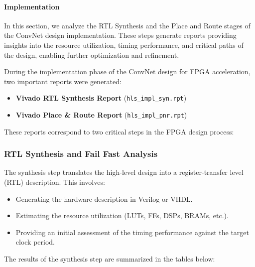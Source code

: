 \documentclass{article}
\begin{document}
\paragraph{Implementation}
In this section, we analyze the RTL Synthesis and the Place and Route stages of the ConvNet design implementation. These steps generate reports providing insights into the resource utilization, timing performance, and critical paths of the design, enabling further optimization and refinement.

During the implementation phase of the ConvNet design for FPGA acceleration, two important reports were generated:

\begin{itemize}
    \item \textbf{Vivado RTL Synthesis Report} (\texttt{hls\_impl\_syn.rpt})
    \item \textbf{Vivado Place \& Route Report} (\texttt{hls\_impl\_pnr.rpt})
\end{itemize}

These reports correspond to two critical steps in the FPGA design process: 

\subsubsection{RTL Synthesis and Fail Fast Analysis}
The synthesis step translates the high-level design into a register-transfer level (RTL) description. This involves:
\begin{itemize}
    \item Generating the hardware description in Verilog or VHDL.
    \item Estimating the resource utilization (LUTs, FFs, DSPs, BRAMs, etc.).
    \item Providing an initial assessment of the timing performance against the target clock period.
\end{itemize}

The results of the synthesis step are summarized in the tables below:
\end{document}
